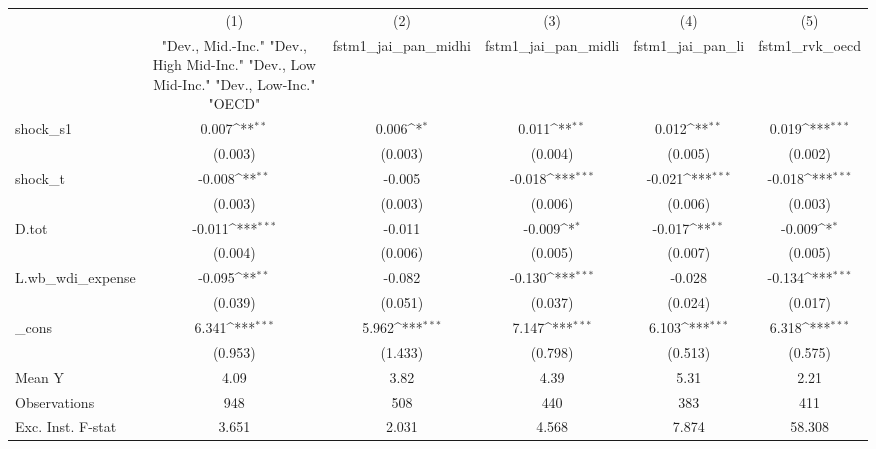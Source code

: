 {
\def\sym#1{\ifmmode^{#1}\else\(^{#1}\)\fi}
\begin{tabular}{l*{5}{c}}
\toprule
            &\multicolumn{1}{c}{(1)}&\multicolumn{1}{c}{(2)}&\multicolumn{1}{c}{(3)}&\multicolumn{1}{c}{(4)}&\multicolumn{1}{c}{(5)}\\
            &\multicolumn{1}{c}{ "Dev., Mid.-Inc." "Dev., High Mid-Inc." "Dev., Low Mid-Inc." "Dev., Low-Inc." "OECD" }&\multicolumn{1}{c}{fstm1\_jai\_pan\_midhi}&\multicolumn{1}{c}{fstm1\_jai\_pan\_midli}&\multicolumn{1}{c}{fstm1\_jai\_pan\_li}&\multicolumn{1}{c}{fstm1\_rvk\_oecd}\\
\midrule
shock\_s1    &       0.007\sym{**} &       0.006\sym{*}  &       0.011\sym{**} &       0.012\sym{**} &       0.019\sym{***}\\
            &     (0.003)         &     (0.003)         &     (0.004)         &     (0.005)         &     (0.002)         \\
\addlinespace
shock\_t     &      -0.008\sym{**} &      -0.005         &      -0.018\sym{***}&      -0.021\sym{***}&      -0.018\sym{***}\\
            &     (0.003)         &     (0.003)         &     (0.006)         &     (0.006)         &     (0.003)         \\
\addlinespace
D.tot       &      -0.011\sym{***}&      -0.011         &      -0.009\sym{*}  &      -0.017\sym{**} &      -0.009\sym{*}  \\
            &     (0.004)         &     (0.006)         &     (0.005)         &     (0.007)         &     (0.005)         \\
\addlinespace
L.wb\_wdi\_expense&      -0.095\sym{**} &      -0.082         &      -0.130\sym{***}&      -0.028         &      -0.134\sym{***}\\
            &     (0.039)         &     (0.051)         &     (0.037)         &     (0.024)         &     (0.017)         \\
\addlinespace
\_cons      &       6.341\sym{***}&       5.962\sym{***}&       7.147\sym{***}&       6.103\sym{***}&       6.318\sym{***}\\
            &     (0.953)         &     (1.433)         &     (0.798)         &     (0.513)         &     (0.575)         \\
\midrule
Mean Y      &        4.09         &        3.82         &        4.39         &        5.31         &        2.21         \\
Observations&         948         &         508         &         440         &         383         &         411         \\
Exc. Inst. F-stat&       3.651         &       2.031         &       4.568         &       7.874         &      58.308         \\
\bottomrule
\end{tabular}
}
